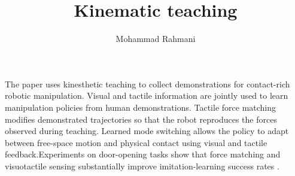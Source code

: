 \documentclass[a4paper]{article}
\title{Kinematic teaching}
\date{}
\author{Mohammad Rahmani}
\begin{document}
    \maketitle
    The paper uses kinesthetic teaching to collect demonstrations for contact-rich robotic manipulation.
    Visual and tactile information are jointly used to learn manipulation policies from human demonstrations.
    Tactile force matching modifies demonstrated trajectories so that the robot reproduces the forces observed during teaching. Learned mode switching allows the policy to adapt between free-space motion and physical contact using visual and tactile feedback.Experiments on door-opening tasks show that force matching and visuotactile sensing substantially improve imitation-learning success rates \cite{ablett-2025-multimodal-and-force-matched-imitation-learning-with-a-see-through-visuotactile-sensor}.
    
    
\end{document}
